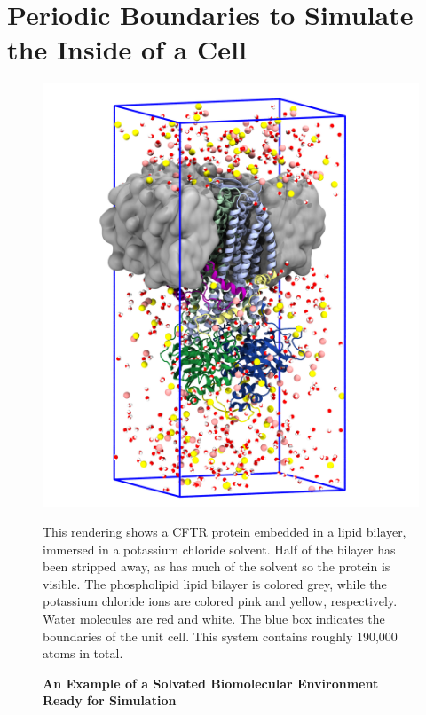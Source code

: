 \section{Periodic Boundaries to Simulate the Inside of a Cell}
\begin{figure}
	\begin{center}
		\includegraphics[width=\textwidth]{figures/MD_unit_cell_example/MD_system.png}
	\end{center}
	\captionsetup{singlelinecheck = false, justification=raggedright}
	\caption[An Example of a Solvated Biomolecular Environment Ready for Simulation] {\textbf{An Example of a Solvated Biomolecular Environment Ready for Simulation}}{This rendering shows a CFTR protein embedded in a lipid bilayer, immersed in a potassium chloride solvent. Half of the bilayer has been stripped away, as has much of the solvent so the protein is visible. The phospholipid lipid bilayer is colored grey, while the potassium chloride ions are colored pink and yellow, respectively. Water molecules are red and white. The blue box indicates the boundaries of the unit cell. This system contains roughly 190,000 atoms in total.}
	\label{MD_environment}
\end{figure}

